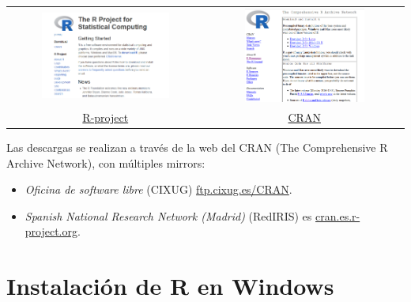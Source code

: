\documentclass[
]{book}
\providecommand{\tightlist}{%
  \setlength{\itemsep}{0pt}\setlength{\parskip}{0pt}}
\begin{document}
\begin{longtable}[]{@{}cc@{}}
\toprule\noalign{}
\endhead
\bottomrule\noalign{}
\endlastfoot
\includegraphics[width=0.68\textwidth,height=\textheight]{images/rproject.png} & \includegraphics[width=0.63\textwidth,height=\textheight]{images/cran.png} \\
\href{https://r-project.org}{R-project} & \href{https://cran.r-project.org}{CRAN} \\
\end{longtable}

Las descargas se realizan a través de la web del CRAN (The Comprehensive
R Archive Network), con múltiples mirrors:

\begin{itemize}
\tightlist
\item
  \emph{Oficina de software libre} (CIXUG) \href{http://ftp.cixug.es/CRAN/}{ftp.cixug.es/CRAN}.
\item
  \emph{Spanish National Research Network (Madrid)} (RedIRIS) es
  \href{http://cran.es.r-project.org/}{cran.es.r-project.org}.
\end{itemize}

\hypertarget{instalaciuxf3n-de-r-en-windows}{%
\section{Instalación de R en Windows}\label{instalaciuxf3n-de-r-en-windows}}
\end{document}
